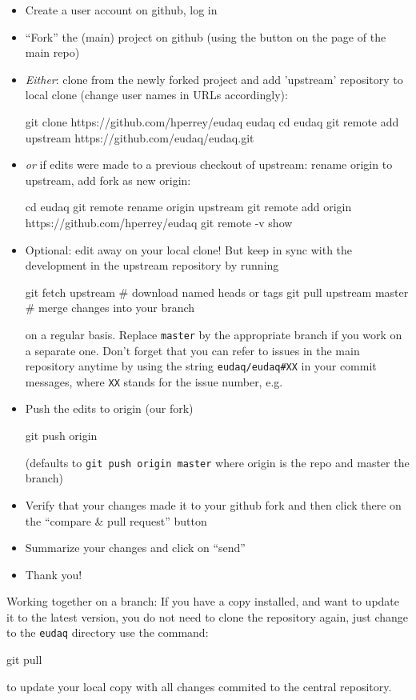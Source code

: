 \begin{itemize}
\item Create a user account on github, log in
\item ``Fork'' the (main) project on github (using the button on the page of the main repo)
\item \emph{Either}: clone from the newly forked project and add
  'upstream' repository to local clone (change user names in URLs
  accordingly):
  \begin{listing}[mybash]
git clone https://github.com/hperrey/eudaq eudaq
cd eudaq
git remote add upstream https://github.com/eudaq/eudaq.git
\end{listing}
\item \emph{or} if edits were made to a previous checkout of upstream: rename origin to upstream, add fork as new origin:

  \begin{listing}[mybash]
cd eudaq
git remote rename origin upstream
git remote add origin https://github.com/hperrey/eudaq
git remote -v show
\end{listing}
\item Optional: edit away on your local clone! But keep in sync with
  the development in the upstream repository by running
  \begin{listing}
git fetch upstream        # download named heads or tags
git pull upstream master  # merge changes into your branch
\end{listing}
on a regular basis. Replace \texttt{master} by the appropriate branch if you work on a separate one.
Don't forget that you can refer to issues in the main repository anytime by using the string \texttt{eudaq/eudaq\#XX} in your commit messages, where \texttt{XX} stands for the issue number, e.g.
\item Push the edits to origin (our fork)
  \begin{listing}[mybash]
git push origin
\end{listing}
(defaults to \texttt{git push origin master} where origin is the repo and master the branch)
\item Verify that your changes made it to your github fork and then click there on the ``compare \& pull request'' button
\item Summarize your changes and click on ``send''
\item Thank you!
\end{itemize}


Working together on a branch:
If you have a copy installed, and want to update it to the
latest version, you do not need to clone the repository again, just change to the \texttt{eudaq} directory use the command:
\begin{listing}[mybash]
git pull
\end{listing}
to update your local copy with all changes commited to the central repository.%

